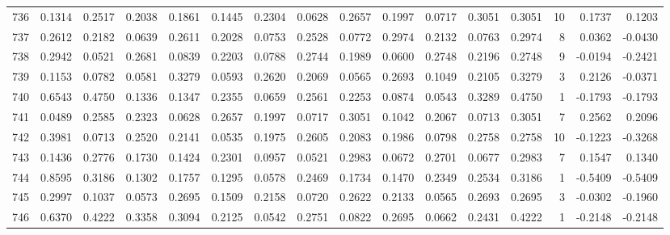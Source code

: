 \begin{tabular}{lrrrrrrrrrrrrrrr}
736 &      0.1314 &  0.2517 &  0.2038 &  0.1861 &  0.1445 &  0.2304 &  0.0628 &  0.2657 &  0.1997 &  0.0717 &   0.3051 &     0.3051 &     10 &                    0.1737 &                     0.1203 \\
737 &      0.2612 &  0.2182 &  0.0639 &  0.2611 &  0.2028 &  0.0753 &  0.2528 &  0.0772 &  0.2974 &  0.2132 &   0.0763 &     0.2974 &      8 &                    0.0362 &                    -0.0430 \\
738 &      0.2942 &  0.0521 &  0.2681 &  0.0839 &  0.2203 &  0.0788 &  0.2744 &  0.1989 &  0.0600 &  0.2748 &   0.2196 &     0.2748 &      9 &                   -0.0194 &                    -0.2421 \\
739 &      0.1153 &  0.0782 &  0.0581 &  0.3279 &  0.0593 &  0.2620 &  0.2069 &  0.0565 &  0.2693 &  0.1049 &   0.2105 &     0.3279 &      3 &                    0.2126 &                    -0.0371 \\
740 &      0.6543 &  0.4750 &  0.1336 &  0.1347 &  0.2355 &  0.0659 &  0.2561 &  0.2253 &  0.0874 &  0.0543 &   0.3289 &     0.4750 &      1 &                   -0.1793 &                    -0.1793 \\
741 &      0.0489 &  0.2585 &  0.2323 &  0.0628 &  0.2657 &  0.1997 &  0.0717 &  0.3051 &  0.1042 &  0.2067 &   0.0713 &     0.3051 &      7 &                    0.2562 &                     0.2096 \\
742 &      0.3981 &  0.0713 &  0.2520 &  0.2141 &  0.0535 &  0.1975 &  0.2605 &  0.2083 &  0.1986 &  0.0798 &   0.2758 &     0.2758 &     10 &                   -0.1223 &                    -0.3268 \\
743 &      0.1436 &  0.2776 &  0.1730 &  0.1424 &  0.2301 &  0.0957 &  0.0521 &  0.2983 &  0.0672 &  0.2701 &   0.0677 &     0.2983 &      7 &                    0.1547 &                     0.1340 \\
744 &      0.8595 &  0.3186 &  0.1302 &  0.1757 &  0.1295 &  0.0578 &  0.2469 &  0.1734 &  0.1470 &  0.2349 &   0.2534 &     0.3186 &      1 &                   -0.5409 &                    -0.5409 \\
745 &      0.2997 &  0.1037 &  0.0573 &  0.2695 &  0.1509 &  0.2158 &  0.0720 &  0.2622 &  0.2133 &  0.0565 &   0.2693 &     0.2695 &      3 &                   -0.0302 &                    -0.1960 \\
746 &      0.6370 &  0.4222 &  0.3358 &  0.3094 &  0.2125 &  0.0542 &  0.2751 &  0.0822 &  0.2695 &  0.0662 &   0.2431 &     0.4222 &      1 &                   -0.2148 &                    -0.2148 \\

\end{tabular}
